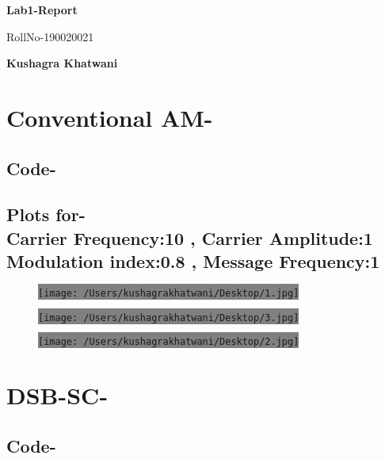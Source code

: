 \documentclass[12pt,A4paper]{article}
\begin{document}
        \begin{center}
        \vspace*{1cm}    
        \Huge
        \textbf{Lab1-Report}
            
        \vspace{0.5cm}
        \LARGE
        RollNo-190020021
            
        \vspace{0.5cm}
            
        \textbf{Kushagra Khatwani}
	\end{center}
	
	\vspace{.5cm}
	
	\section{Conventional AM-}
	\subsection*{Code-}
	
	\subsection*{Plots for-\\
					Carrier Frequency:10 , Carrier Amplitude:1\\
					Modulation index:0.8  ,  Message Frequency:1\\}
	\begin{figure}[H]
		\centering
	\colorbox{gray}{\texttt{[image: /Users/kushagrakhatwani/Desktop/1.jpg]}}
	\end{figure}
		\begin{figure}[H]
		\centering
	\colorbox{gray}{\texttt{[image: /Users/kushagrakhatwani/Desktop/3.jpg]}}
	\end{figure}
	\begin{figure}[H]
		\centering
	\colorbox{gray}{\texttt{[image: /Users/kushagrakhatwani/Desktop/2.jpg]}}
	\end{figure}
	\section{DSB-SC-}
	\subsection*{Code-}
	
\end{document}
